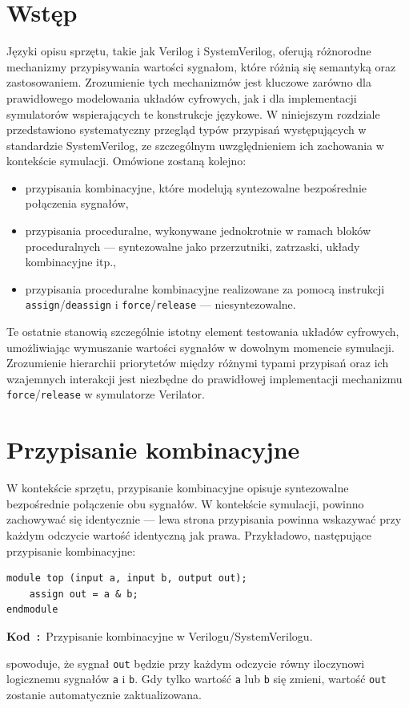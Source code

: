 \documentclass[shortabstract, inz]{iithesis}
\newcounter{kod}[chapter]
\renewcommand{\thekod}{\thechapter\arabic{kod}}
\newcommand{\codecaption}[2]{%
  \par\refstepcounter{kod}\label{#1}%
  \noindent\textbf{Kod~\thekod:}~#2\par
  \vspace*{1.0\baselineskip}%
}
\begin{document}
\section{Wstęp}
Języki opisu sprzętu, takie jak Verilog i SystemVerilog, oferują różnorodne mechanizmy przypisywania wartości sygnałom, które różnią się semantyką oraz zastosowaniem. Zrozumienie tych mechanizmów jest kluczowe zarówno dla prawidłowego modelowania układów cyfrowych, jak i dla implementacji symulatorów wspierających te konstrukcje językowe. W niniejszym rozdziale przedstawiono systematyczny przegląd typów przypisań występujących w standardzie SystemVerilog, ze szczególnym uwzględnieniem ich zachowania w kontekście symulacji. Omówione zostaną kolejno:
\begin{itemize}
\item przypisania kombinacyjne, które modelują syntezowalne bezpośrednie połączenia sygnałów,
\item przypisania proceduralne, wykonywane jednokrotnie w ramach bloków proceduralnych --- syntezowalne jako przerzutniki, zatrzaski, układy kombinacyjne itp.,
\item przypisania proceduralne kombinacyjne realizowane za pomocą instrukcji \linebreak \texttt{assign}/\texttt{deassign} i \texttt{force}/\texttt{release} --- niesyntezowalne.
\end{itemize}

Te ostatnie stanowią szczególnie istotny element testowania układów cyfrowych, umożliwiając wymuszanie wartości sygnałów w dowolnym momencie symulacji. Zrozumienie hierarchii priorytetów między różnymi typami przypisań oraz ich wzajemnych interakcji jest niezbędne do prawidłowej implementacji mechanizmu \texttt{force}/\texttt{release} w symulatorze Verilator.

\section{Przypisanie kombinacyjne}
W kontekście sprzętu, przypisanie kombinacyjne opisuje syntezowalne bezpośrednie połączenie obu sygnałów. W kontekście symulacji, powinno zachowywać się identycznie --- lewa strona przypisania powinna wskazywać przy każdym odczycie wartość identyczną jak prawa. Przykładowo, następujące przypisanie kombinacyjne:
\begin{verbatim}
module top (input a, input b, output out);
    assign out = a & b;
endmodule
\end{verbatim}
\codecaption{lst:comb-assign}{Przypisanie kombinacyjne w Verilogu/SystemVerilogu.}
spowoduje, że sygnał \texttt{out} będzie przy każdym odczycie równy iloczynowi logicznemu sygnałów \texttt{a} i \texttt{b}. Gdy tylko wartość \texttt{a} lub \texttt{b} się zmieni, wartość \texttt{out} zostanie automatycznie zaktualizowana.
\end{document}
